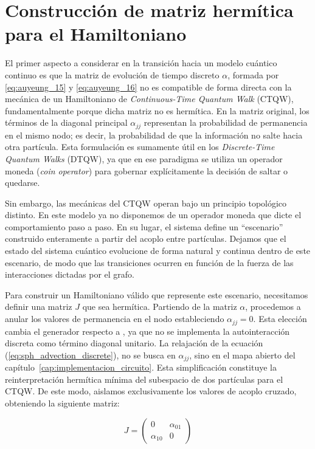 \section{Construcción de matriz hermítica para el Hamiltoniano}
\label{sec:Contruccion_J}

El primer aspecto a considerar en la transición hacia un modelo cuántico continuo es que la matriz de evolución de tiempo discreto $\alpha$, formada por \eqref{eq:auyeung_15} y \eqref{eq:auyeung_16} no es compatible de forma directa con la mecánica de un Hamiltoniano de \textit{Continuous-Time Quantum Walk} (CTQW), fundamentalmente porque dicha matriz no es hermítica. En la matriz original, los términos de la diagonal principal $\alpha_{jj}$ representan la probabilidad de permanencia en el mismo nodo; es decir, la probabilidad de que la información no salte hacia otra partícula. Esta formulación es sumamente útil en los \textit{Discrete-Time Quantum Walks} (DTQW), ya que en ese paradigma se utiliza un operador moneda (\textit{coin operator}) para gobernar explícitamente la decisión de saltar o quedarse. 

Sin embargo, las mecánicas del CTQW operan bajo un principio topológico distinto. En este modelo ya no disponemos de un operador moneda que dicte el comportamiento paso a paso. En su lugar, el sistema define un ``escenario'' construido enteramente a partir del acoplo entre partículas. Dejamos que el estado del sistema cuántico evolucione de forma natural y continua dentro de este escenario, de modo que las transiciones ocurren en función de la fuerza de las interacciones dictadas por el grafo.

Para construir un Hamiltoniano válido que represente este escenario, necesitamos definir una matriz $J$ que sea hermítica. Partiendo de la matriz $\alpha$, procedemos a anular los valores de permanencia en el nodo estableciendo $\alpha_{jj} = 0$. Esta elección cambia el generador respecto a \cite{auyeung2024}, ya que no se implementa la autointeracción discreta como término diagonal unitario. La relajación de la ecuación (\eqref{eq:sph_advection_discrete}), no se busca en $\alpha_{jj}$, sino en el mapa abierto del capítulo~\ref{cap:implementacion_circuito}. Esta simplificación constituye la reinterpretación hermítica mínima del subespacio de dos partículas para el CTQW. De este modo, aislamos exclusivamente los valores de acoplo cruzado, obteniendo la siguiente matriz:

\begin{equation}
J = 
\begin{pmatrix}
0 & \alpha_{01} \\
\alpha_{10} & 0
\end{pmatrix}
\end{equation}

